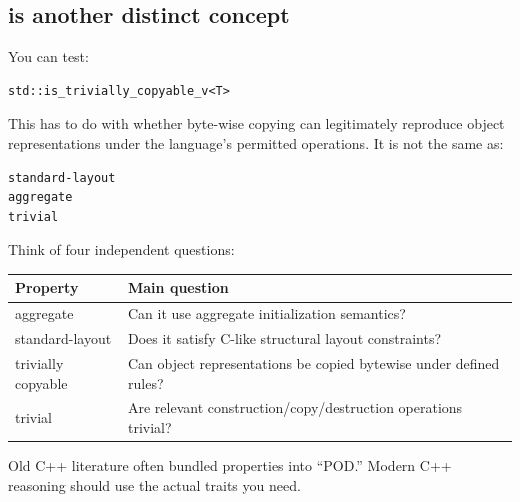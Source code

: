 \subsection{\texorpdfstring{ is another distinct concept}{trivially\_copyable is another distinct concept}}\label{01-foundations-i-ch003-trivially_copyable-is-another-distinct-concept}

\hypertarget{01-foundations-i-ch003-trivially_copyable-is-another-distinct-concept}{}

You can test:

\begin{verbatim}
std::is_trivially_copyable_v<T>
\end{verbatim}

This has to do with whether byte-wise copying can legitimately reproduce object representations under the language's permitted operations. It is not the same as:

\begin{verbatim}
standard-layout
aggregate
trivial
\end{verbatim}

Think of four independent questions:

{\def\LTcaptype{none} %
\begin{longtable}[]{@{}
  >{\raggedright\arraybackslash}p{}
  >{\raggedright\arraybackslash}p{}@{}}
\toprule\noalign{}
\begin{minipage}[b]{\linewidth}\raggedright
Property
\end{minipage} & \begin{minipage}[b]{\linewidth}\raggedright
Main question
\end{minipage} \\
\midrule\noalign{}
\endhead
\bottomrule\noalign{}
\endlastfoot
aggregate & Can it use aggregate initialization semantics? \\
standard-layout & Does it satisfy C-like structural layout constraints? \\
trivially copyable & Can object representations be copied bytewise under defined rules? \\
trivial & Are relevant construction/copy/destruction operations trivial? \\
\end{longtable}
}

Old C++ literature often bundled properties into ``POD.'' Modern C++ reasoning should use the actual traits you need.

